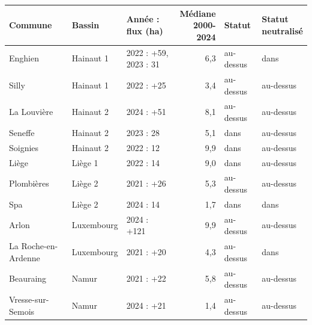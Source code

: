 \begin{tabular}{llp{4.2cm}rll}
\toprule
Commune & Bassin & Année : flux (ha) & \makecell{Médiane\\2000-2024} & Statut & \makecell{Statut\\neutralisé} \\
\midrule
Enghien & Hainaut 1 & 2022 : +59, 2023 : \textminus{}31 & 6{,}3 & au-dessus & dans \\
Silly & Hainaut 1 & 2022 : +25 & 3{,}4 & au-dessus & au-dessus \\
La Louvière & Hainaut 2 & 2024 : +51 & 8{,}1 & au-dessus & au-dessus \\
Seneffe & Hainaut 2 & 2023 : \textminus{}28 & 5{,}1 & dans & au-dessus \\
Soignies & Hainaut 2 & 2022 : \textminus{}12 & 9{,}9 & dans & au-dessus \\
Liège & Liège 1 & 2022 : \textminus{}14 & 9{,}0 & dans & au-dessus \\
Plombières & Liège 2 & 2021 : +26 & 5{,}3 & au-dessus & au-dessus \\
Spa & Liège 2 & 2024 : \textminus{}14 & 1{,}7 & dans & dans \\
Arlon & Luxembourg & 2024 : +121 & 9{,}9 & au-dessus & au-dessus \\
La Roche-en-Ardenne & Luxembourg & 2021 : +20 & 4{,}3 & au-dessus & dans \\
Beauraing & Namur & 2021 : +22 & 5{,}8 & au-dessus & au-dessus \\
Vresse-sur-Semois & Namur & 2024 : +21 & 1{,}4 & au-dessus & au-dessus \\
\bottomrule
\end{tabular}
